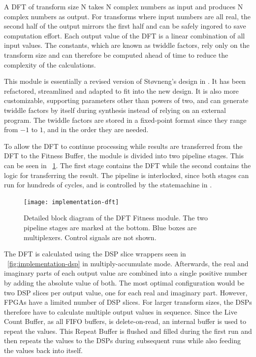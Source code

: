 A DFT of transform size N takes N complex numbers as input and produces N complex numbers as output.
For transforms where input numbers are all real, the second half of the output mirrors the first half and can be safely ingored to save computation effort.
Each output value of the DFT is a linear combination of all input values.
The constants, which are known as twiddle factors, rely only on the transform size and can therefore be computed ahead of time to reduce the complexity of the calculations.
\CN

This module is essentially a revised version of Støvneng's design in \cite{stovneng2014sblock}.
It has been refactored, streamlined and adapted to fit into the new design.
It is also more customizable, supporting parameters other than powers of two, and can generate twiddle factors by itself during synthesis instead of relying on an external program.
The twiddle factors are stored in a fixed-point format since they range from $-1$ to $1$, and in the order they are needed.

To allow the DFT to continue processing while results are transferred from the DFT to the Fitness Buffer, the module is divided into two pipeline stages.
This can be seen in \figurename~\ref{fig:implementation-dft}.
The first stage contains the DFT while the second contains the logic for transferring the result.
The pipeline is interlocked, since both stages can run for hundreds of cycles, and is controlled by the statemachine in .

\begin{figure}[!ht]
    \centering
    \texttt{[image: implementation-dft]}
    \caption[DFT Fitness]{
        Detailed block diagram of the DFT Fitness module.
        The two pipeline stages are marked at the bottom.
        Blue boxes are multiplexers.
        Control signals are not shown.
    }
    \label{fig:implementation-dft}
\end{figure}

The DFT is calculated using the DSP slice wrappers seen in \figurename~\ref{fig:implementation-dsp} in multiply-accumulate mode.
Afterwards, the real and imaginary parts of each output value are combined into a single positive number by adding the absolute value of both.
The most optimal configuration would be two DSP slices per output value, one for each real and imaginary part.
However, FPGAs have a limited number of DSP slices.
For larger transform sizes, the DSPs therefore have to calculate multiple output values in sequence.
Since the Live Count Buffer, as all FIFO buffers, is delete-on-read, an internal buffer is used to repeat the values.
This Repeat Buffer is flushed and filled during the first run and then repeats the values to the DSPs during subsequent runs while also feeding the values back into itself.

